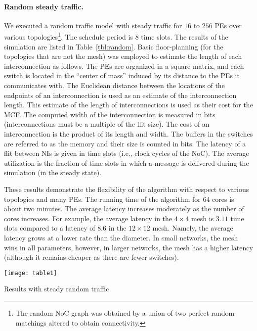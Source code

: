 \documentclass[a4paper,12pt]{article}
\newenvironment{proof sketch}[1]{\noindent {\emph{Proof sketch of #1:}}}{\hfill \qed}
\begin{document}
\paragraph{Random steady traffic.}  We executed a random traffic model with steady
traffic for $16$ to $256$ PEs over various topologies\footnote{The random NoC graph
  was obtained by a union of two perfect random matchings altered to obtain
  connectivity.}.  The schedule period is $8$ time slots.  The results of the
simulation are listed in Table~\ref{tbl:random}.  Basic floor-planning (for the
topologies that are not the mesh) was employed to estimate the length of each
interconnection as follows.  The PEs are organized in a square matrix, and each
switch is located in the ``center of mass'' induced by its distance to the PEs it
communicates with. The Euclidean distance between the locations of the endpoints of
an interconnection is used as an estimate of the interconnection length.  This
estimate of the length of interconnections is used as their cost for the MCF.  The
computed width of the interconnection is measured in bits (interconnections must be a
multiple of the flit size). The cost of an interconnection is the product of its
length and width. The buffers in the switches are referred to as the memory and their
size is counted in bits.  The latency of a flit between NIs is given in time slots
(i.e., clock cycles of the NoC).  The average utilization is the fraction of time
slots in which a message is delivered during the simulation (in the steady state).

These results demonstrate the flexibility of the algorithm with respect to various
topologies and many PEs. The running time of the algorithm for $64$ cores is about
two minutes. The average latency increases moderately as the number of cores
increases. For example, the average latency in the $4\times 4$ mesh is $3.11$ time
slots compared to a latency of $8.6$ in the $12\times 12$ mesh. Namely, the average
latency grows at a lower rate than the diameter.  In small networks, the mesh wins in
all parameters, however, in larger networks, the mesh has a higher latency (although
it remains cheaper as there are fewer switches).


%
\begin{table}
{\centering\texttt{[image: table1]}}
  \caption{Results with steady random traffic}
  \label{tbl:random}
\end{table}
\end{document}
